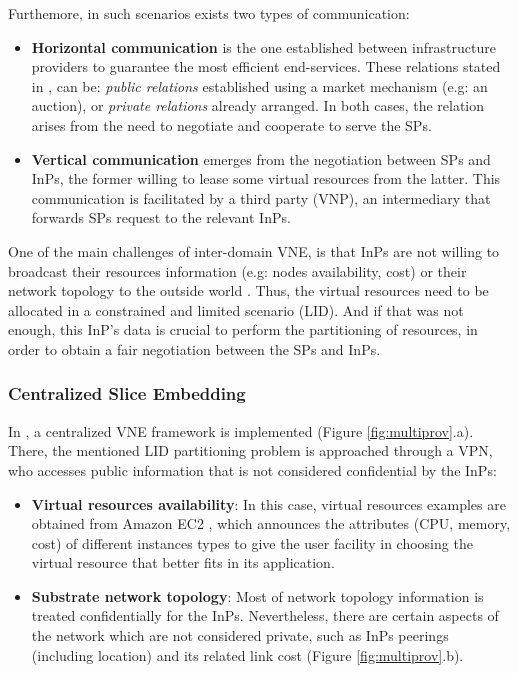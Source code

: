 Furthemore, in such scenarios exists two types of communication:

\begin{itemize}	
	\item \textbf{Horizontal communication} is the one established between infrastructure providers to guarantee the most efficient end-services. These relations stated in \citep{zaheer2010multi}, can be: \textit{public relations} established using a market mechanism (e.g: an auction), or \textit{private relations} already arranged. In both cases, the relation arises from the need to negotiate and cooperate to serve the SPs.
	\item \textbf{Vertical communication} emerges from the negotiation between SPs and InPs, the former willing to lease some virtual resources from the latter. This communication is facilitated by a third party (VNP), an intermediary that forwards SPs request to the relevant InPs.
\end{itemize}

One of the main challenges of inter-domain VNE, is that InPs are not willing to broadcast their resources information (e.g: nodes availability, cost) or their network topology to the outside world \citep{dietrich2015multi}. Thus, the virtual resources need to be allocated in a constrained and limited scenario (LID). And if that was not enough, this InP's data is crucial to perform the partitioning of resources, in order to obtain a fair negotiation between the SPs and InPs.

\subsubsection{Centralized Slice Embedding}

In \citep{dietrich2015multi}, a centralized VNE framework is implemented (Figure \ref{fig:multiprov}.a). There, the mentioned LID partitioning problem is approached through a VPN, who accesses public information that is not considered confidential by the InPs:

\begin{itemize}
	\item \textbf{Virtual resources availability}: In this case, virtual resources examples are obtained from Amazon EC2 \cite{amazonEC2}, which announces the attributes (CPU, memory, cost) of different instances types to give the user facility in choosing the virtual resource that better fits in its application.
	\item \textbf{Substrate network topology}: Most of network topology information is treated confidentially for the InPs. Nevertheless, there are certain aspects of the network which are not considered private, such as InPs peerings (including location) and its related link cost (Figure \ref{fig:multiprov}.b).
\end{itemize}

